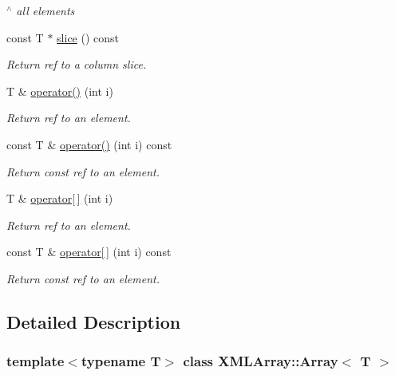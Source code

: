 \begin{DoxyCompactItemize}
\begin{DoxyCompactList}\small\item\em $^\wedge$ all elements \end{DoxyCompactList}\item 
const T $\ast$ \mbox{\hyperlink{classXMLArray_1_1Array_a9c9e3fdc44557d1241103c207f7f69af}{slice}} () const
\begin{DoxyCompactList}\small\item\em Return ref to a column slice. \end{DoxyCompactList}\item 
T \& \mbox{\hyperlink{classXMLArray_1_1Array_aaa5b7fcaa413265173fc75d3a5bbf837}{operator()}} (int i)
\begin{DoxyCompactList}\small\item\em Return ref to an element. \end{DoxyCompactList}\item 
const T \& \mbox{\hyperlink{classXMLArray_1_1Array_a6935c8d1efcf82e7c751717a94e7c145}{operator()}} (int i) const
\begin{DoxyCompactList}\small\item\em Return const ref to an element. \end{DoxyCompactList}\item 
T \& \mbox{\hyperlink{classXMLArray_1_1Array_a42dbfab67d875b6fa456cade78f70f8f}{operator\mbox{[}$\,$\mbox{]}}} (int i)
\begin{DoxyCompactList}\small\item\em Return ref to an element. \end{DoxyCompactList}\item 
const T \& \mbox{\hyperlink{classXMLArray_1_1Array_a8e51d308c4e6b81cdbf1be40377afda8}{operator\mbox{[}$\,$\mbox{]}}} (int i) const
\begin{DoxyCompactList}\small\item\em Return const ref to an element. \end{DoxyCompactList}\end{DoxyCompactItemize}


\subsection{Detailed Description}
\subsubsection*{template$<$typename T$>$\newline
class X\+M\+L\+Array\+::\+Array$<$ T $>$}

